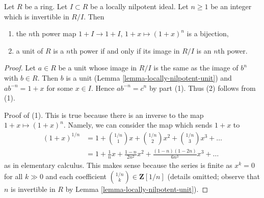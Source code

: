 \begin{lemma}
\label{lemma-lift-nth-roots}
Let $R$ be a ring. Let $I \subset R$ be a locally nilpotent ideal.
Let $n \geq 1$ be an integer which is invertible in $R/I$. Then
\begin{enumerate}
\item the $n$th power map $1 + I \to 1 + I$, $1 + x \mapsto (1 + x)^n$
is a bijection,
\item a unit of $R$ is a $n$th power if and only if its image in $R/I$
is an $n$th power.
\end{enumerate}
\end{lemma}

\begin{proof}
Let $a \in R$ be a unit whose image in $R/I$ is the same as the image
of $b^n$ with $b \in R$. Then $b$ is a unit
(Lemma \ref{lemma-locally-nilpotent-unit}) and
$ab^{-n} = 1 + x$ for some $x \in I$. Hence $ab^{-n} = c^n$ by
part (1). Thus (2) follows from (1).

\medskip\noindent
Proof of (1). This is true because there is an inverse to the
map $1 + x \mapsto (1 + x)^n$. Namely, we can consider the map
which sends $1 + x$ to
\begin{align*}
(1 + x)^{1/n}
& =
1 + {1/n \choose 1}x +
{1/n \choose 2}x^2 +
{1/n \choose 3}x^3 + \ldots \\
& =
1 + \frac{1}{n} x + \frac{1 - n}{2n^2}x^2 +
\frac{(1 - n)(1 - 2n)}{6n^3}x^3 + \ldots
\end{align*}
as in elementary calculus. This makes sense because the series is finite
as $x^k = 0$ for all $k \gg 0$ and each coefficient
${1/n \choose k} \in \mathbf{Z}[1/n]$ (details omitted; observe that
$n$ is invertible in $R$ by Lemma \ref{lemma-locally-nilpotent-unit}).
\end{proof}